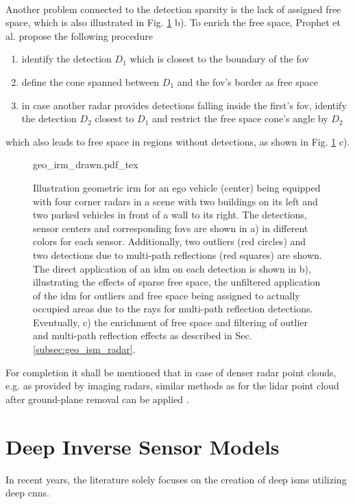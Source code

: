 \\
Another problem connected to the detection sparsity is the lack of assigned free space, which is also illustrated in Fig. \ref{fig:geo_irm_drawn} b). To enrich the free space, Prophet et al. \cite{prophet2018adaptions} propose the following procedure
\begin{enumerate}
	\item identify the detection $D_1$ which is closest to the boundary of the \gls{fov}
	\item define the cone spanned between $D_1$ and the \gls{fov}'s border as free space
	\item in case another radar provides detections falling inside the first's \gls{fov}, identify the detection $D_2$ closest to $D_1$ and restrict the free space cone's angle by $D_2$   
\end{enumerate}
which also leads to free space in regions without detections, as shown in Fig. \ref{fig:geo_irm_drawn} c).
\begin{figure}[htb!]
	\begin{center}
		{geo_irm_drawn.pdf_tex}
		\caption{\label{fig:geo_irm_drawn}Illustration geometric \gls{irm} for an ego vehicle (center) being equipped with four corner radars in a scene with two buildings on its left and two parked vehicles in front of a wall to its right. The detections, sensor centers and corresponding \gls{fov}s are shown in a) in different colors for each sensor. Additionally, two outliers (red circles) and two detections due to multi-path reflections (red squares) are shown. The direct application of an \gls{idm} on each detection is shown in b), illustrating the effects of sparse free space, the unfiltered application of the \gls{idm} for outliers and free space being assigned to actually occupied areas due to the rays for multi-path reflection detections. Eventually, c) the enrichment of free space and filtering of outlier and multi-path reflection effects as described in Sec. \ref{subsec:geo_ism_radar}.}
	\end{center}
\end{figure} 
For completion it shall be mentioned that in case of denser radar point clouds, e.g. as provided by imaging radars, similar methods as for the lidar point cloud after ground-plane removal can be applied \cite{slutsky2019dual}.
%
\section{Deep Inverse Sensor Models}
\label{sec:deep_isms}
In recent years, the literature solely focuses on the creation of deep \gls{ism}s utilizing deep \gls{cnn}s. 
%
